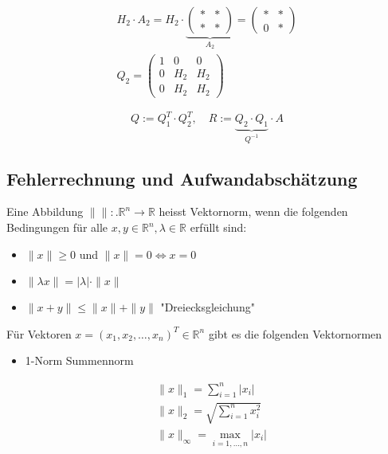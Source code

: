 $$
\begin{gathered}
H_{2} \cdot A_{2}=H_{2} \cdot \underbrace{\left(\begin{array}{ll}
* & * \\
* & *
\end{array}\right)}_{A_{2}}=\left(\begin{array}{ll}
* & * \\
0 & *
\end{array}\right) \\
Q_{2}=\left(\begin{array}{ccc}
1 & 0 & 0 \\
0 & H_{2} & H_{2} \\
0 & H_{2} & H_{2}
\end{array}\right)
\end{gathered}
$$

$$
Q:=Q_{1}^{T} \cdot Q_{2}^{T}, \quad R:=\underbrace{Q_{2} \cdot Q_{1}}_{Q^{-1}} \cdot A
$$

\subsection{Fehlerrechnung und Aufwandabschätzung}

Eine Abbildung $\|\|:. \mathbb{R}^{n} \rightarrow \mathbb{R}$ heisst Vektornorm, wenn die folgenden Bedingungen für alle $x, y \in \mathbb{R}^{n}, \lambda \in \mathbb{R}$ erfüllt sind:

\begin{itemize}
  \item $\|x\| \geq 0$ und $\|x\|=0 \Leftrightarrow x=0$
  \item $\|\lambda x\|=|\lambda| \cdot\|x\|$
  \item $\|x+y\| \leq\|x\|+\|y\|$ "Dreiecksgleichung"
\end{itemize}

Für Vektoren $x=\left(x_{1}, x_{2}, \ldots, x_{n}\right)^{T} \in \mathbb{R}^{n}$ gibt es die folgenden Vektornormen

\begin{itemize}
  \item 1-Norm Summennorm
\end{itemize}

$$
\begin{aligned}
& \|x\|_{1}=\sum_{i=1}^{n}\left|x_{i}\right| \\
& \|x\|_{2}=\sqrt{\sum_{i=1}^{n} x_{i}^{2}} \\
& \|x\|_{\infty}=\max _{i=1, \ldots, n}\left|x_{i}\right|
\end{aligned}
$$


